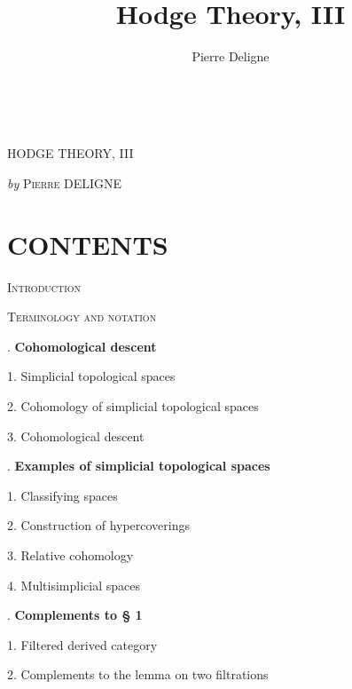 \documentclass[11pt,leqno]{article}
\title{Hodge Theory, III}
\author{Pierre Deligne}
\date{}
\newcommand{\Page}[1]{\ifvmode\noindent\else\unskip\ \fi{\footnotesize\textcolor{gray}{[p.\,#1]}}\ \ignorespaces}
\begin{document}
\maketitle
\Page{5}

\begin{center}
{\Large HODGE THEORY, III\par}
\medskip
{\large \textit{by} \textsc{Pierre} DELIGNE\par}
\end{center}

\section*{\centering\normalfont CONTENTS}

\begingroup
\small
\noindent\textsc{Introduction}\par
\medskip
\noindent\textsc{Terminology and notation}\par
\medskip
{}. \textbf{Cohomological descent}\par
\noindent\hspace*{1.5em}1. Simplicial topological spaces\par
\noindent\hspace*{1.5em}2. Cohomology of simplicial topological spaces\par
\noindent\hspace*{1.5em}3. Cohomological descent\par
\medskip
{}. \textbf{Examples of simplicial topological spaces}\par
\noindent\hspace*{1.5em}1. Classifying spaces\par
\noindent\hspace*{1.5em}2. Construction of hypercoverings\par
\noindent\hspace*{1.5em}3. Relative cohomology\par
\noindent\hspace*{1.5em}4. Multisimplicial spaces\par
\medskip
{}. \textbf{Complements to § 1}\par
\noindent\hspace*{1.5em}1. Filtered derived category\par
\noindent\hspace*{1.5em}2. Complements to the lemma on two filtrations\par
\end{document}
